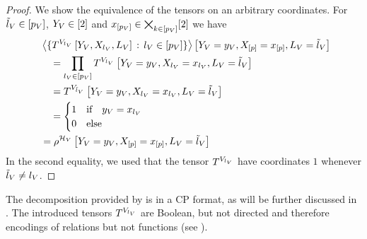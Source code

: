 \begin{proof}
	We show the equivalence of the tensors on an arbitrary coordinates.
	For $\tilde{l}_{V}\in[p_{V}]$, $Y_{V}\in[2]$ and $x_{[p_{V}]}\in\bigtimes_{k\in[p_{V}]}[2]$ we have
	\begin{align*}
		& \contractionof{
			\{\selectorcomponentofat{\selindexof{\vselectionsymbol}}{\vselectionheadvar,\catvariableof{\selindexof{\vselectionsymbol}},\selvariableof{\vselectionsymbol}} \, : \, \selindexofin{\vselectionsymbol}\}
		}{\indexedheadvariableof{\vselectionsymbol},\indexedcatvariableof{[\seldim]},\selvariableof{\vselectionsymbol} = \tilde{\selindex}_{\vselectionsymbol}} \\
		& \quad = 
		\prod_{\selindexofin{\vselectionsymbol}} \selectorcomponentofat{\selindexof{\vselectionsymbol}}{
			\indexedheadvariableof{\vselectionsymbol},\indexedcatvariableof{\selindexof{\vselectionsymbol}},\selvariableof{\vselectionsymbol}=\tilde{\selindex}_{\vselectionsymbol}
			} \\
		& \quad = \selectorcomponentofat{\tilde{\selindex}_{\vselectionsymbol}}{
			\indexedheadvariableof{\vselectionsymbol},\indexedcatvariableof{\selindexof{\vselectionsymbol}},\selvariableof{\vselectionsymbol}=\tilde{\selindex}_{\vselectionsymbol}
		} \\
		& \quad = 
		\begin{cases}
		 	1 & \text{if} \quad \headindexof{\vselectionsymbol} = \catindexof{\selindexof{\vselectionsymbol}} \\
		 	0 & \text{else}  
		 \end{cases} \\ 
		 & = \rencodingofat{\vselectionmap}{\indexedheadvariableof{\vselectionsymbol},\indexedcatvariableof{[\seldim]},\selvariableof{\vselectionsymbol}=\tilde{\selindex}_{\vselectionsymbol}}
	\end{align*}
	In the second equality, we used that the tensor $T^{V_{l_{V}}}$ have coordinates $1$ whenever $\tilde{l}_{V}\neq l_{V}$.
\end{proof}


The decomposition provided by  is in a CP format, as will be further discussed in .
The introduced tensors $T^{V_{l_{V}}}$ are Boolean, but not directed and therefore encodings of relations but not functions (see ).

